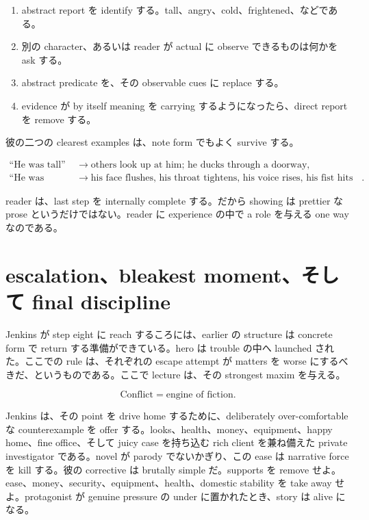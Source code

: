 \begin{enumerate}
\item abstract report を identify する。tall、angry、cold、frightened、などである。
\item 別の character、あるいは reader が actual に observe できるものは何かを ask する。
\item abstract predicate を、その observable cues に replace する。
\item evidence が by itself meaning を carrying するようになったら、direct report を remove する。
\end{enumerate}

彼の二つの clearest examples は、note form でもよく survive する。

\begin{align}
\text{``He was tall''} &\to \text{others look up at him; he ducks through a doorway},\\
\text{``He was angry''} &\to \text{his face flushes, his throat tightens, his voice rises, his fist hits the table}.
\end{align}

reader は、last step を internally complete する。だから showing は prettier な prose というだけではない。reader に experience の中で a role を与える one way なのである。

\section{escalation、bleakest moment、そして final discipline}

Jenkins が step eight に reach するころには、earlier の structure は concrete form で return する準備ができている。hero は trouble の中へ launched された。ここでの rule は、それぞれの escape attempt が matters を worse にするべきだ、というものである。ここで lecture は、その strongest maxim を与える。

\begin{equation}
\text{Conflict}=\text{engine of fiction}.
\end{equation}

Jenkins は、その point を drive home するために、deliberately over-comfortable な counterexample を offer する。looks、health、money、equipment、happy home、fine office、そして juicy case を持ち込む rich client を兼ね備えた private investigator である。novel が parody でないかぎり、この ease は narrative force を kill する。彼の corrective は brutally simple だ。supports を remove せよ。ease、money、security、equipment、health、domestic stability を take away せよ。protagonist が genuine pressure の under に置かれたとき、story は alive になる。

